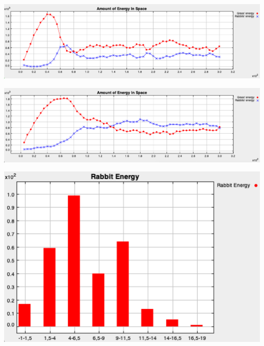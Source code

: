 \documentclass[11pt]{article}
\begin{document}
\begin{minipage}[]{\textwidth}

\begin{minipage}[]{0.5\textwidth}
\begin{minipage}[]{\textwidth}
\includegraphics[width=\textwidth]{1-rabbits/Images-report/evolution-20.png}
\end{minipage}
\hfill
\begin{minipage}[]{\textwidth}
\includegraphics[width=\textwidth]{1-rabbits/Images-report/evolution-50.png}
\end{minipage}{}
\label{fig:exp1}
\end{minipage}{}
\hfill
\begin{minipage}[]{0.35\textwidth}
 \includegraphics[width=\textwidth]{1-rabbits/Images-report/rabbit-energy-150.png}
 \label{fig:exp2}
\end{minipage}{}

\end{minipage}{}
\end{document}
